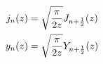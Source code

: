\documentclass[12pt]{article}
\begin{document}
\begin{align}
j_n(z) &= \sqrt{\frac{\pi}{2z}} J_{n+\frac{1}{2}}(z) \notag \\
y_n(z) &= \sqrt{\frac{\pi}{2z}} Y_{n+\frac{1}{2}}(z) \notag
\end{align}
\end{document}
